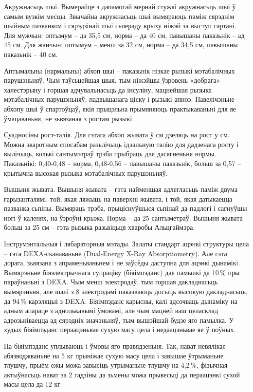 Акружнасьць шыі. Вымерайце з дапамогай мернай стужкі акружнасьць шыі ў самым вузкім месцы. Звычайна акружнасьць шыі вымяраюць паміж сярэднім шыйным пазванком і сярэдзінай шыі сьпераду крыху ніжэй за выступ гартані. Для мужчын: оптымум – да 35,5 см, норма – да 40 см, павышаны паказьнік – ад 45 см. Для жанчын: оптымум – менш за 32 см, норма – да 34,5 см, павышаны паказьнік – 40 см.

Аптымальны (нармальны) абхоп шыі – паказьнік нізкае рызыкі мэтабалічных парушэньняў. Чым таўсьцейшая шыя, тым ніжэйшы ўзровень «добрага» халестэрыну і горшая адчувальнасьць да інсуліну, мацнейшая рызыка мэтабалічных парушэньняў, падвышанага ціску і рызыкі апноэ. Павелічэньне абхопу шыі ў спартоўцаў, якія прыцэльна прымяняюць практыкаваньні для яе ўмацаваньня, не зьвязаная з ростам рызыкі.

Суадносіны рост-талія. Для гэтага абхоп жывата ў см дзеляць на рост у см. Можна зваротным спосабам разьлічыць ідэальную талію для дадзенага росту і вылічыць, колькі сантымэтраў трэба прыбраць для дасягненьня нормы. Паказьнікі: 0,40-0,48 – норма, 0,48-0,56 – павышаны паказьнік, больш за 0,57 – крытычна высокая рызыка мэтабалічных парушэньняў.

Вышыня жывата. Вышыня жывата – гэта найменшая адлегласьць паміж двума гарызанталямі: той, якая ляжыць на паверхні жывата, і той, якая датыкаецца пазванка сьпіны. Вымяраць трэба, прыціснуўшыся сьпінай да падлогі і сагнуўшы ногі ў каленях, на ўзроўні крыжа. Норма – да 25 сантыметраў. Вышыня жывата больш за 25 см – гэта рызыка разьвіцьця хваробы Альцгаймэра.

Інструмэнтальныя і лябараторныя мэтады. Залаты стандарт ацэнкі структуры цела – гэта DEXA-сканаваньне (Dual-Energy X-Ray Absorptiometry). Але гэта дорага, зьвязана з апраменьваньнем і не заўсёды даступна для ацэнкі дынамікі. Вымярэньне біяэлектрычнага супраціву (біяімпэданс) дае памылкі да 10\,\% пры параўнаньні з DEXA. Чым менш электродаў, тым горшая дакладнасьць вымярэньня, але шалі з 8 электродамі паказваюць досыць высокую дакладнасьць, да 94\,\% карэляцыі з DEXA. Біяімпэданс карысны, калі адсочваць дынаміку на адным апараце з аднолькавымі ўмовамі, але чым мацней ваш целасклад адрозьніваецца ад сярэдніх значэньняў, тым вышэйшай будзе яго памылка. У худых біяімпэданс пераацэньвае сухую масу цела і недаацэньвае яе ў поўных.

На біяімпэданс уплываюць і ўмовы яго правядзеньня. Так, нават невялікае абязводжваньне на 5 кг прыніжае сухую масу цела і завышае ўтрыманьне тлушчу, прыём ежы можа завысіць утрыманьне тлушчу на 4,2\,\%, фізычная актыўнасьць нават за 2 гадзіны да зьмены можа прывесьці да пераацэнкі сухой масы цела да 12 кг

